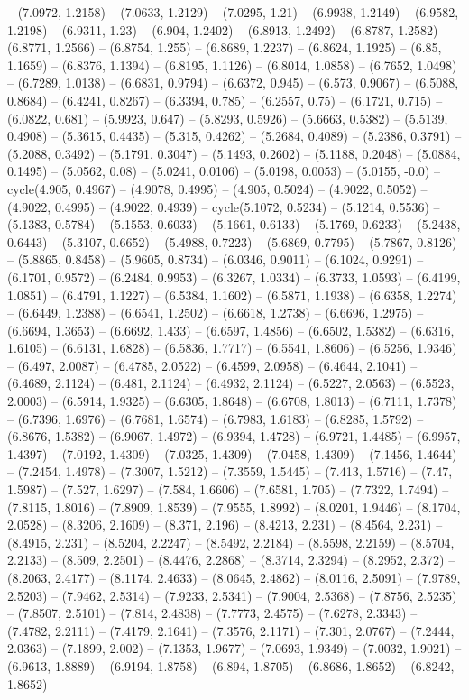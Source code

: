 -- (7.0972, 1.2158) -- (7.0633, 1.2129) -- (7.0295, 1.21) -- (6.9938, 1.2149) -- (6.9582, 1.2198) -- (6.9311, 1.23) -- (6.904, 1.2402) -- (6.8913, 1.2492) -- (6.8787, 1.2582) -- (6.8771, 1.2566) -- (6.8754, 1.255) -- (6.8689, 1.2237) -- (6.8624, 1.1925) -- (6.85, 1.1659) -- (6.8376, 1.1394) -- (6.8195, 1.1126) -- (6.8014, 1.0858) -- (6.7652, 1.0498) -- (6.7289, 1.0138) -- (6.6831, 0.9794) -- (6.6372, 0.945) -- (6.573, 0.9067) -- (6.5088, 0.8684) -- (6.4241, 0.8267) -- (6.3394, 0.785) -- (6.2557, 0.75) -- (6.1721, 0.715) -- (6.0822, 0.681) -- (5.9923, 0.647) -- (5.8293, 0.5926) -- (5.6663, 0.5382) -- (5.5139, 0.4908) -- (5.3615, 0.4435) -- (5.315, 0.4262) -- (5.2684, 0.4089) -- (5.2386, 0.3791) -- (5.2088, 0.3492) -- (5.1791, 0.3047) -- (5.1493, 0.2602) -- (5.1188, 0.2048) -- (5.0884, 0.1495) -- (5.0562, 0.08) -- (5.0241, 0.0106) -- (5.0198, 0.0053) -- (5.0155, -0.0) -- cycle(4.905, 0.4967) -- (4.9078, 0.4995) -- (4.905, 0.5024) -- (4.9022, 0.5052) -- (4.9022, 0.4995) -- (4.9022, 0.4939) -- cycle(5.1072, 0.5234) -- (5.1214, 0.5536) -- (5.1383, 0.5784) -- (5.1553, 0.6033) -- (5.1661, 0.6133) -- (5.1769, 0.6233) -- (5.2438, 0.6443) -- (5.3107, 0.6652) -- (5.4988, 0.7223) -- (5.6869, 0.7795) -- (5.7867, 0.8126) -- (5.8865, 0.8458) -- (5.9605, 0.8734) -- (6.0346, 0.9011) -- (6.1024, 0.9291) -- (6.1701, 0.9572) -- (6.2484, 0.9953) -- (6.3267, 1.0334) -- (6.3733, 1.0593) -- (6.4199, 1.0851) -- (6.4791, 1.1227) -- (6.5384, 1.1602) -- (6.5871, 1.1938) -- (6.6358, 1.2274) -- (6.6449, 1.2388) -- (6.6541, 1.2502) -- (6.6618, 1.2738) -- (6.6696, 1.2975) -- (6.6694, 1.3653) -- (6.6692, 1.433) -- (6.6597, 1.4856) -- (6.6502, 1.5382) -- (6.6316, 1.6105) -- (6.6131, 1.6828) -- (6.5836, 1.7717) -- (6.5541, 1.8606) -- (6.5256, 1.9346) -- (6.497, 2.0087) -- (6.4785, 2.0522) -- (6.4599, 2.0958) -- (6.4644, 2.1041) -- (6.4689, 2.1124) -- (6.481, 2.1124) -- (6.4932, 2.1124) -- (6.5227, 2.0563) -- (6.5523, 2.0003) -- (6.5914, 1.9325) -- (6.6305, 1.8648) -- (6.6708, 1.8013) -- (6.7111, 1.7378) -- (6.7396, 1.6976) -- (6.7681, 1.6574) -- (6.7983, 1.6183) -- (6.8285, 1.5792) -- (6.8676, 1.5382) -- (6.9067, 1.4972) -- (6.9394, 1.4728) -- (6.9721, 1.4485) -- (6.9957, 1.4397) -- (7.0192, 1.4309) -- (7.0325, 1.4309) -- (7.0458, 1.4309) -- (7.1456, 1.4644) -- (7.2454, 1.4978) -- (7.3007, 1.5212) -- (7.3559, 1.5445) -- (7.413, 1.5716) -- (7.47, 1.5987) -- (7.527, 1.6297) -- (7.584, 1.6606) -- (7.6581, 1.705) -- (7.7322, 1.7494) -- (7.8115, 1.8016) -- (7.8909, 1.8539) -- (7.9555, 1.8992) -- (8.0201, 1.9446) -- (8.1704, 2.0528) -- (8.3206, 2.1609) -- (8.371, 2.196) -- (8.4213, 2.231) -- (8.4564, 2.231) -- (8.4915, 2.231) -- (8.5204, 2.2247) -- (8.5492, 2.2184) -- (8.5598, 2.2159) -- (8.5704, 2.2133) -- (8.509, 2.2501) -- (8.4476, 2.2868) -- (8.3714, 2.3294) -- (8.2952, 2.372) -- (8.2063, 2.4177) -- (8.1174, 2.4633) -- (8.0645, 2.4862) -- (8.0116, 2.5091) -- (7.9789, 2.5203) -- (7.9462, 2.5314) -- (7.9233, 2.5341) -- (7.9004, 2.5368) -- (7.8756, 2.5235) -- (7.8507, 2.5101) -- (7.814, 2.4838) -- (7.7773, 2.4575) -- (7.6278, 2.3343) -- (7.4782, 2.2111) -- (7.4179, 2.1641) -- (7.3576, 2.1171) -- (7.301, 2.0767) -- (7.2444, 2.0363) -- (7.1899, 2.002) -- (7.1353, 1.9677) -- (7.0693, 1.9349) -- (7.0032, 1.9021) -- (6.9613, 1.8889) -- (6.9194, 1.8758) -- (6.894, 1.8705) -- (6.8686, 1.8652) -- (6.8242, 1.8652) -- 